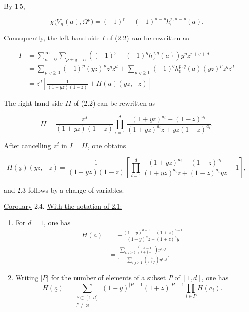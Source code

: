 By 1.5,

\begin{equation*}
\chi\bigl(V_n(\underline a),\Omega^p\bigr)
=(-1)^p+(-1)^{n-p}h_0^{p,n-p}(\underline a).
\end{equation*}

Consequently, the left-hand side $I$ of (2.2) can be rewritten as

\begin{align*}
I
&=\sum_{n=0}^{\infty}\sum_{p+q=n}
\left((-1)^p+(-1)^q h_0^{p,q}(\underline a)\right)y^pz^{p+q+d}\\
&=\sum_{p,q\geq0}(-1)^p(yz)^pz^qz^d
+\sum_{p,q\geq0}(-1)^q h_0^{p,q}(\underline a)(yz)^pz^qz^d\\
&=z^d\left[\frac{1}{(1+yz)(1-z)}
+H(\underline a)(yz,-z)\right].
\end{align*}

The right-hand side $II$ of (2.2) can be rewritten as

\begin{equation*}
II=\frac{z^d}{(1+yz)(1-z)}
\prod_{i=1}^d
\frac{(1+yz)^{a_i}-(1-z)^{a_i}}
{(1+yz)^{a_i}z+yz(1-z)^{a_i}}.
\end{equation*}

After cancelling $z^d$ in $I=II$, one obtains

\begin{equation*}
H(\underline a)(yz,-z)
=\frac{1}{(1+yz)(1-z)}\left[
\prod_{i=1}^d
\frac{(1+yz)^{a_i}-(1-z)^{a_i}}
{(1+yz)^{a_i}z+(1-z)^{a_i}yz}-1\right],
\end{equation*}

and 2.3 follows by a change of variables.


\underline{Corollary} 2.4. \underline{With the notation of 2.1:}

\begin{enumerate}[label=(\roman*),leftmargin=2.6em]
\item \underline{For $d=1$, one has}
\begin{equation*}
\begin{aligned}
H(a)
&=-\frac{(1+y)^{a-1}-(1+z)^{a-1}}
{(1+y)^az-(1+z)^ay}\\[1ex]
&=\frac{\displaystyle\sum_{i,j\geq0}
\binom{a-1}{i+j+1}y^iz^j}
{\displaystyle1-\sum_{i,j\geq1}\binom{a}{i+j}y^iz^j}.
\end{aligned}
\end{equation*}

\item \underline{Writing $|P|$ for the number of elements of a subset
$P$ of $[1,d]$, one has}
\begin{equation*}
H(\underline a)=
\sum_{\substack{P\subset[1,d]\\P\ne\varnothing}}
(1+y)^{|P|-1}(1+z)^{|P|-1}
\prod_{i\in P}H(a_i).
\end{equation*}
\end{enumerate}

